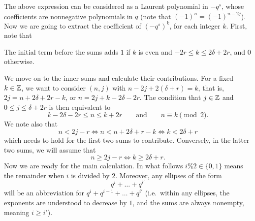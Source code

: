 The above expression can be considered as a Laurent polynomial in $-q^s$,
whose coefficients are nonnegative polynomials in $q$ (note that $(-1)^n = (-1)^{n-2j}$).
Now we are going to extract the coefficient of $(-q^s)^k$, for each integer $k$.
First, note that
\begin{itemize}
  \ii The initial term before the sums adds $1$
  if $k$ is even and $-2r \le k \le 2\delta + 2r$, and $0$ otherwise.
\end{itemize}
We move on to the inner sums and calculate their contributions.
For a fixed $k \in \mathbb Z$, we want to consider $(n,j)$ with $n-2j + 2(\delta+r) = k$,
that is, $2j = n + 2\delta + 2r - k$, or $n = 2j + k - 2\delta - 2r$.
The condition that $j \in \mathbb Z$ and $0 \le j \le \delta+2r$ is then equivalent to
\begin{equation}
  k-2\delta-2r \le n \le k+2r \qquad\text{and}\qquad n \equiv k \pmod 2.
  \label{eq:outer_assumption}
\end{equation}
We note also that
\begin{equation}
  n < 2j-r \iff n < n + 2 \delta + r - k \iff k < 2\delta + r
  \label{eq:outer_half_assumption_12}
\end{equation}
which needs to hold for the first two sums to contribute.
Conversely, in the latter two sums, we will assume that
\begin{equation}
  n \ge 2j-r \iff k \ge 2\delta + r.
  \label{eq:outer_half_assumption_34}
\end{equation}
Now we are ready for the main calculation.
In what follows $i \% 2 \in \{0,1\}$ means the remainder when $i$ is divided by $2$.
Moreover, any ellipses of the form
\[ q^i + \dots + q^{i'} \]
will be an abbreviation for $q^i + q^{i-1} + \dots + q^{i'}$
(i.e.\ within any ellipses, the exponents are understood to decrease by $1$,
and the sums are always nonempty, meaning $i \ge i'$).

